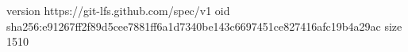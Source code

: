 version https://git-lfs.github.com/spec/v1
oid sha256:e91267ff2f89d5cee7881ff6a1d7340be143c6697451ce827416afc19b4a29ac
size 1510
